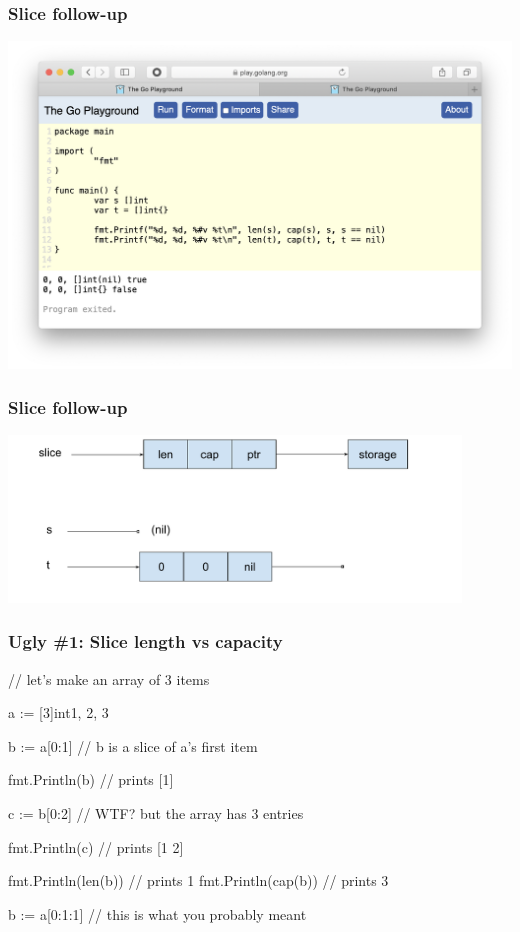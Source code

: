 \documentclass[handout,compress,t,11pt]{beamer}
\begin{document}
\begin{frame}[fragile]
\frametitle{Slice follow-up}
\begin{center}
\includegraphics[height=0.9\textheight]{slice-declarations.png}
\end{center}
\end{frame}

\begin{frame}[fragile]
\frametitle{Slice follow-up}
\begin{center}
\vspace{3\baselineskip}
\includegraphics[width=0.9\textwidth]{slice-picture.pdf}
\end{center}
\end{frame}

\begin{frame}[fragile]
    \frametitle{Ugly \#1: Slice length vs capacity}
\begin{golang}
// let's make an array of 3 items

a := [3]int{1, 2, 3}

b := a[0:1]          // b is a slice of a's first item

fmt.Println(b)       // prints [1]

c := b[0:2]          // WTF? but the array has 3 entries

fmt.Println(c)       // prints [1 2]

fmt.Println(len(b))  // prints 1
fmt.Println(cap(b))  // prints 3

b := a[0:1:1]        // this is what you probably meant
\end{golang}
\end{frame}
\end{document}
